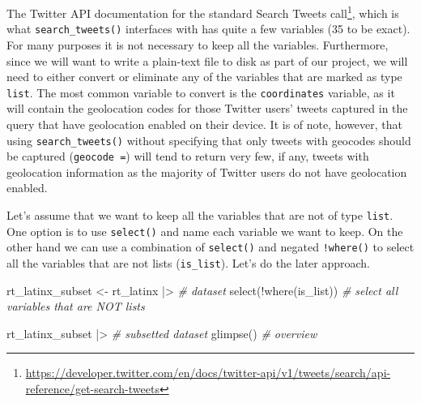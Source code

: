 \documentclass[
  letterpaper,
]{scrbook}
\newenvironment{Shaded}{\begin{snugshade}}{\end{snugshade}}
\newcommand{\CommentTok}[1]{\textcolor[rgb]{0.00,0.00,0.00}{\textit{#1}}}
\newcommand{\FunctionTok}[1]{\textcolor[rgb]{0.00,0.00,0.00}{#1}}
\newcommand{\NormalTok}[1]{\textcolor[rgb]{0.00,0.00,0.00}{#1}}
\newcommand{\OtherTok}[1]{\textcolor[rgb]{0.00,0.00,0.00}{#1}}
\newcommand{\SpecialCharTok}[1]{\textcolor[rgb]{0.00,0.00,0.00}{#1}}
\DeclareRobustCommand{\href}[2]{#2\footnote{\url{#1}}}
\begin{document}
The
\href{https://developer.twitter.com/en/docs/twitter-api/v1/tweets/search/api-reference/get-search-tweets}{Twitter
API documentation for the standard Search Tweets call}, which is what
\texttt{search\_tweets()} interfaces with has quite a few variables (35
to be exact). For many purposes it is not necessary to keep all the
variables. Furthermore, since we will want to write a plain-text file to
disk as part of our project, we will need to either convert or eliminate
any of the variables that are marked as type \texttt{list}. The most
common variable to convert is the \texttt{coordinates} variable, as it
will contain the geolocation codes for those Twitter users' tweets
captured in the query that have geolocation enabled on their device. It
is of note, however, that using \texttt{search\_tweets()} without
specifying that only tweets with geocodes should be captured
(\texttt{geocode\ =}) will tend to return very few, if any, tweets with
geolocation information as the majority of Twitter users do not have
geolocation enabled.

Let's assume that we want to keep all the variables that are not of type
\texttt{list}. One option is to use \texttt{select()} and name each
variable we want to keep. On the other hand we can use a combination of
\texttt{select()} and negated \texttt{!where()} to select all the
variables that are not lists (\texttt{is\_list}). Let's do the later
approach.

\begin{Shaded}
\begin{Highlighting}[]
\NormalTok{rt\_latinx\_subset }\OtherTok{\textless{}{-}} 
\NormalTok{  rt\_latinx }\SpecialCharTok{|\textgreater{}} \CommentTok{\# dataset}
  \FunctionTok{select}\NormalTok{(}\SpecialCharTok{!}\FunctionTok{where}\NormalTok{(is\_list))  }\CommentTok{\# select all variables that are NOT lists}

\NormalTok{rt\_latinx\_subset }\SpecialCharTok{|\textgreater{}} \CommentTok{\# subsetted dataset}
  \FunctionTok{glimpse}\NormalTok{() }\CommentTok{\# overview}
\end{Highlighting}
\end{Shaded}
\end{document}
